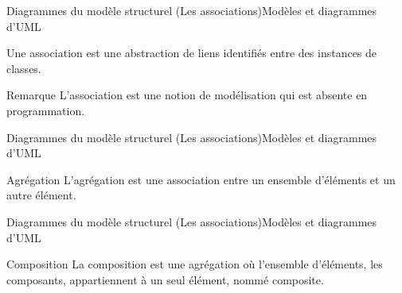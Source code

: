 \documentclass{beamer}
\begin{document}
    \begin{frame}{Diagrammes du modèle structurel (Les associations)}{Modèles et diagrammes d'UML}
      \begin{Definition}
        Une association est une abstraction de liens identifiés entre des instances de classes.
      \end{Definition}

      \begin{Example}
        \pause
      \end{Example}

      \begin{block}{Remarque}
        L'association est une notion de modélisation qui est absente en programmation.
      \end{block}
    \end{frame}

    \begin{frame}{Diagrammes du modèle structurel (Les associations)}{Modèles et diagrammes d'UML}
      \begin{block}{Agrégation}
        L'agrégation est une association entre un ensemble d'éléments et un autre élément.
      \end{block}

      \begin{Example}
      \end{Example}
    \end{frame}

  \begin{frame}{Diagrammes du modèle structurel (Les associations)}{Modèles et diagrammes d'UML}
    \begin{block}{Composition}
      La composition est une agrégation où l'ensemble d'éléments, les composants, appartiennent à un seul élément, nommé composite.
    \end{block}

    \begin{Example}
    \end{Example}
  \end{frame}
\end{document}
